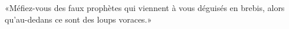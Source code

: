 \encetemps \jesusdisciples
	«Méfiez-vous des faux prophètes qui viennent à vous déguisés en brebis,
	alors qu’au-dedans ce sont des loups voraces.»

